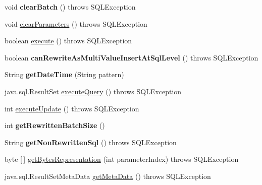 \begin{DoxyCompactItemize}
void {\bfseries clear\+Batch} ()  throws S\+Q\+L\+Exception 
\item 
void \mbox{\hyperlink{classcom_1_1mysql_1_1jdbc_1_1_prepared_statement_ac1bd628fd165487d93822d0198ead08a}{clear\+Parameters}} ()  throws S\+Q\+L\+Exception 
\item 
boolean \mbox{\hyperlink{classcom_1_1mysql_1_1jdbc_1_1_prepared_statement_a4c83f4279e13f60aa65dd4de3d2117e1}{execute}} ()  throws S\+Q\+L\+Exception 
\item 
\mbox{\label{classcom_1_1mysql_1_1jdbc_1_1_prepared_statement_aabc927c92b71b3250b3b297dd9ea796b}} 
boolean {\bfseries can\+Rewrite\+As\+Multi\+Value\+Insert\+At\+Sql\+Level} ()  throws S\+Q\+L\+Exception 
\item 
\mbox{\label{classcom_1_1mysql_1_1jdbc_1_1_prepared_statement_a9e4270861fadbc1b2510175104deb829}} 
String {\bfseries get\+Date\+Time} (String pattern)
\item 
java.\+sql.\+Result\+Set \mbox{\hyperlink{classcom_1_1mysql_1_1jdbc_1_1_prepared_statement_a4a9164e855e1f7848142de8973a6dab6}{execute\+Query}} ()  throws S\+Q\+L\+Exception 
\item 
int \mbox{\hyperlink{classcom_1_1mysql_1_1jdbc_1_1_prepared_statement_a356cdeaae7b10fb79da4806e829a2190}{execute\+Update}} ()  throws S\+Q\+L\+Exception 
\item 
\mbox{\label{classcom_1_1mysql_1_1jdbc_1_1_prepared_statement_a99f44a35ddc148fd4c5aa95a451ca0c1}} 
int {\bfseries get\+Rewritten\+Batch\+Size} ()
\item 
\mbox{\label{classcom_1_1mysql_1_1jdbc_1_1_prepared_statement_a7cf0ecdb1b6ad775131a83ef684a41db}} 
String {\bfseries get\+Non\+Rewritten\+Sql} ()  throws S\+Q\+L\+Exception 
\item 
byte \mbox{[}$\,$\mbox{]} \mbox{\hyperlink{classcom_1_1mysql_1_1jdbc_1_1_prepared_statement_a9d7f8d794591450a31fc804150054196}{get\+Bytes\+Representation}} (int parameter\+Index)  throws S\+Q\+L\+Exception 
\item 
java.\+sql.\+Result\+Set\+Meta\+Data \mbox{\hyperlink{classcom_1_1mysql_1_1jdbc_1_1_prepared_statement_a260be2cc343e066802a49720c672da77}{get\+Meta\+Data}} ()  throws S\+Q\+L\+Exception 

\end{DoxyCompactItemize}
